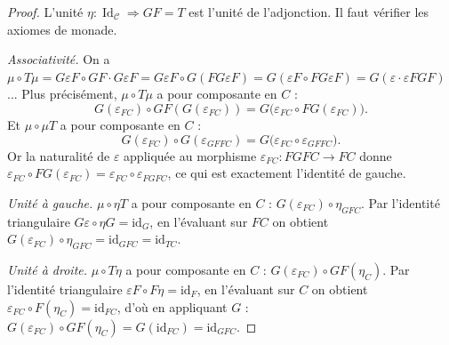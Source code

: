 \documentclass[a4paper,12pt]{book}
\DeclareMathOperator{\Id}{Id}
\newcommand{\id}{\mathrm{id}}
\begin{document}
\begin{proof}
L'unité $\eta \colon \Id_{\mathcal{C}} \Rightarrow GF = T$ est
l'unité de l'adjonction. Il faut vérifier les axiomes de monade.

\emph{Associativité.}
On a $\mu \circ T\mu = G\varepsilon F \circ GF \cdot G\varepsilon F
= G\varepsilon F \circ G(F G\varepsilon F)
= G(\varepsilon F \circ FG\varepsilon F)
= G(\varepsilon \cdot \varepsilon FGF)$... Plus précisément,
$\mu \circ T\mu$ a pour composante en $C$ :
\[
    G(\varepsilon_{FC}) \circ GF(G(\varepsilon_{FC}))
    = G\bigl(\varepsilon_{FC} \circ F G(\varepsilon_{FC})\bigr).
\]
Et $\mu \circ \mu T$ a pour composante en $C$ :
\[
    G(\varepsilon_{FC}) \circ G(\varepsilon_{GFFC})
    = G\bigl(\varepsilon_{FC} \circ \varepsilon_{GFFC}\bigr).
\]
Or la naturalité de $\varepsilon$ appliquée au morphisme
$\varepsilon_{FC} \colon FGFC \to FC$ donne
$\varepsilon_{FC} \circ FG(\varepsilon_{FC})
= \varepsilon_{FC} \circ \varepsilon_{FGFC}$,
ce qui est exactement l'identité de gauche.

\emph{Unité à gauche.}
$\mu \circ \eta T$ a pour composante en $C$ :
$G(\varepsilon_{FC}) \circ \eta_{GFC}$.
Par l'identité triangulaire $G\varepsilon \circ \eta G = \id_G$,
en l'évaluant sur $FC$ on obtient
$G(\varepsilon_{FC}) \circ \eta_{GFC} = \id_{GFC} = \id_{TC}$.

\emph{Unité à droite.}
$\mu \circ T\eta$ a pour composante en $C$ :
$G(\varepsilon_{FC}) \circ GF(\eta_C)$.
Par l'identité triangulaire $\varepsilon F \circ F\eta = \id_F$,
en l'évaluant sur $C$ on obtient
$\varepsilon_{FC} \circ F(\eta_C) = \id_{FC}$,
d'où en appliquant $G$ :
$G(\varepsilon_{FC}) \circ GF(\eta_C) = G(\id_{FC}) = \id_{GFC}$.
\end{proof}
\end{document}
